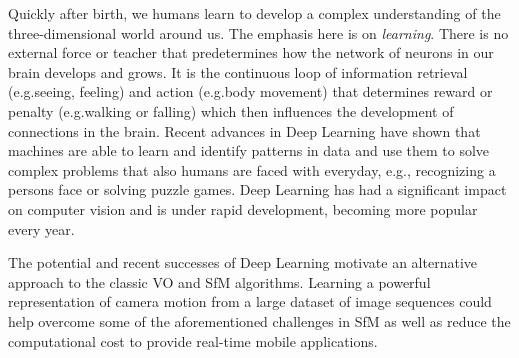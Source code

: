 		Quickly after birth, we humans learn to develop a complex understanding of the three-dimensional world around us. 
		The emphasis here is on \emph{learning}.
		There is no external force or teacher that predetermines how the network of neurons in our brain develops and grows.
		It is the continuous loop of information retrieval (e.g.\@ seeing, feeling) and action (e.g.\@ body movement) that determines reward or penalty (e.g.\@ walking or falling) which then influences the development of connections in the brain.
		Recent advances in Deep Learning have shown that machines are able to learn and identify patterns in data and use them to solve complex problems that also humans are faced with everyday, e.g., recognizing a persons face or solving puzzle games.
		Deep Learning has had a significant impact on computer vision and is under rapid development, becoming more popular every year.
		
		The potential and recent successes of Deep Learning motivate an alternative approach to the classic VO and SfM algorithms.
		Learning a powerful representation of camera motion from a large dataset of image sequences could help overcome some of the aforementioned challenges in SfM as well as reduce the computational cost to provide real-time mobile applications.
		
		
		
		
		
		
